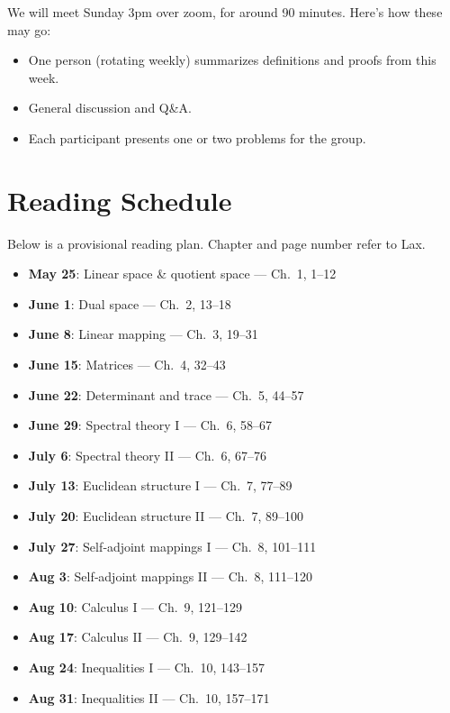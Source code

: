 \documentclass{article}
\begin{document}
We will meet Sunday 3pm over zoom, for around 90 minutes. Here's how these may go:
\begin{itemize}
    \item One person (rotating weekly) summarizes definitions and proofs from this week.
    \item General discussion and Q\&A.
    \item Each participant presents one or two problems for the group.
\end{itemize}

\section{Reading Schedule}
Below is a provisional reading plan. Chapter and page number refer to Lax.

\begin{itemize}
  \item \textbf{May 25}: Linear space \& quotient space — Ch.~1, 1–12
  \item \textbf{June 1}: Dual space — Ch.~2, 13–18
  \item \textbf{June 8}: Linear mapping — Ch.~3, 19–31
  \item \textbf{June 15}: Matrices — Ch.~4, 32–43
  \item \textbf{June 22}: Determinant and trace — Ch.~5, 44–57
  \item \textbf{June 29}: Spectral theory I — Ch.~6, 58–67
  \item \textbf{July 6}: Spectral theory II — Ch.~6, 67–76
  \item \textbf{July 13}: Euclidean structure I — Ch.~7, 77–89
  \item \textbf{July 20}: Euclidean structure II — Ch.~7, 89–100
  \item \textbf{July 27}: Self‑adjoint mappings I — Ch.~8, 101–111
  \item \textbf{Aug 3}: Self‑adjoint mappings II — Ch.~8, 111–120
  \item \textbf{Aug 10}: Calculus I — Ch.~9, 121–129
  \item \textbf{Aug 17}: Calculus II — Ch.~9, 129–142
  \item \textbf{Aug 24}: Inequalities I — Ch.~10, 143–157
  \item \textbf{Aug 31}: Inequalities II — Ch.~10, 157–171
\end{itemize}
\end{document}
